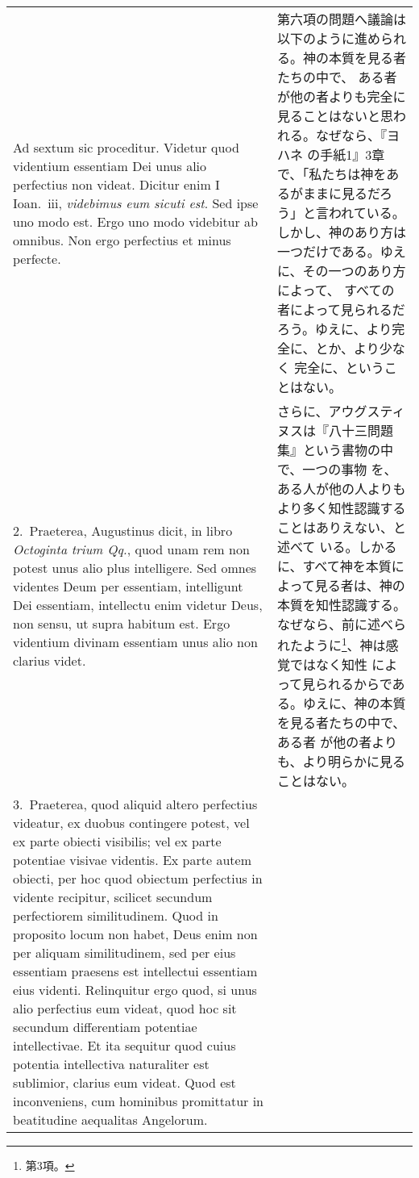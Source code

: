 \documentclass[10pt]{jsarticle} %
\begin{document}
\begin{longtable}{p{21em}p{21em}}
{\sc Ad sextum sic proceditur}. Videtur quod videntium essentiam Dei
unus alio perfectius non videat. Dicitur enim I Ioan.\ {\sc iii}, {\it
videbimus eum sicuti est}. Sed ipse uno modo est. Ergo uno modo
videbitur ab omnibus. Non ergo perfectius et minus perfecte.

&

第六項の問題へ議論は以下のように進められる。神の本質を見る者たちの中で、
ある者が他の者よりも完全に見ることはないと思われる。なぜなら、『ヨハネ
の手紙1』3章で、「私たちは神をあるがままに見るだろう」と言われている。
しかし、神のあり方は一つだけである。ゆえに、その一つのあり方によって、
すべての者によって見られるだろう。ゆえに、より完全に、とか、より少なく
完全に、ということはない。

\\

2.~{\sc Praeterea}, Augustinus dicit, in libro {\it Octoginta trium
Qq.}, quod unam rem non potest unus alio plus intelligere. Sed omnes
videntes Deum per essentiam, intelligunt Dei essentiam, intellectu
enim videtur Deus, non sensu, ut supra habitum est. Ergo videntium
divinam essentiam unus alio non clarius videt.

&

さらに、アウグスティヌスは『八十三問題集』という書物の中で、一つの事物
を、ある人が他の人よりもより多く知性認識することはありえない、と述べて
いる。しかるに、すべて神を本質によって見る者は、神の本質を知性認識する。
なぜなら、前に述べられたように\footnote{第3項。}、神は感覚ではなく知性
によって見られるからである。ゆえに、神の本質を見る者たちの中で、ある者
が他の者よりも、より明らかに見ることはない。

\\

3.~{\sc Praeterea}, quod aliquid altero perfectius videatur, ex duobus
contingere potest, vel ex parte obiecti visibilis; vel ex parte
potentiae visivae videntis. Ex parte autem obiecti, per hoc quod
obiectum perfectius in vidente recipitur, scilicet secundum
perfectiorem similitudinem. Quod in proposito locum non habet, Deus
enim non per aliquam similitudinem, sed per eius essentiam praesens
est intellectui essentiam eius videnti. Relinquitur ergo quod, si unus
alio perfectius eum videat, quod hoc sit secundum differentiam
potentiae intellectivae. Et ita sequitur quod cuius potentia
intellectiva naturaliter est sublimior, clarius eum videat. Quod est
inconveniens, cum hominibus promittatur in beatitudine aequalitas
Angelorum.


\end{longtable}
\end{document}

